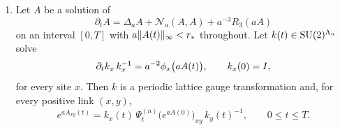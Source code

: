 \begin{lemma}
\begin{enumerate}
\[
 \norm{R_3(\theta)}_\infty\le C\norm\theta_\infty^3,\qquad
 \norm{R_3(\theta)-R_3(\theta')}_\infty\le C\bigl(\norm\theta_\infty^2+\norm{\theta'}_\infty^2\bigr)\norm{\theta-\theta'}_\infty .
\]
Moreover, $R_3$ is a local analytic map whose Taylor coefficients vanish through degree two and satisfy the hypotheses of \cref{ch21:lem:stencil-analytic}. In particular, for $0<a\le1$ the physical remainder $a^{-3}R_3(aA)$ is the sum of a convergent series whose term of degree $m$ carries the factor $a^{m-3}$, $m\ge3$, and on a fixed smaller ball it satisfies the bounds of \cref{ch21:lem:stencil-analytic}, uniformly in the mesh.
\item Let $A$ be a solution of
\[
 \partial_tA=\Delta_aA+\mathcal N_a(A,A)+a^{-3}R_3(aA)
\]
on an interval $[0,T]$ with $a\lVert A(t)\rVert_\infty<r_*$ throughout. Let $k(t)\in\mathrm{SU}(2)^{\Lambda_{n}}$ solve
\[
 \partial_tk_x\,k_x^{-1}=a^{-2}\phi_x\bigl(aA(t)\bigr),\qquad k_x(0)=I,
\]
for every site $x$. Then $k$ is a periodic lattice gauge transformation and, for every positive link $(x,y)$,
\[
 e^{aA_{xy}(t)}=k_x(t)\,\Psi^{(n)}_t\bigl(e^{aA(0)}\bigr)_{xy}\,k_y(t)^{-1},\qquad 0\le t\le T .
\]
\end{enumerate}
\end{lemma}

